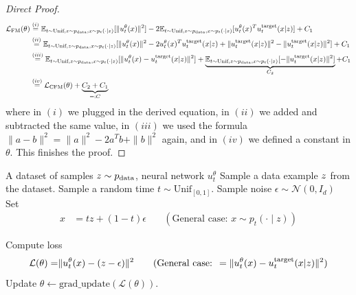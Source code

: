 \begin{proof}[Direct Proof]
\begin{align*}
\mathcal{L}_{\text{FM}}(\theta)&\overset{(i)}{=}\mathbb{E}_{t\sim\text{Unif},z\sim p_{\rm{data}}, x\sim p_t(\cdot|z)}[\|u_t^\theta(x)\|^2]-2\mathbb{E}_{t\sim\text{Unif},z\sim p_{\rm{data}}, x\sim p_t(\cdot|z)}[u_t^\theta(x)^Tu^{\text{target}}_t(x|z)] +C_1\\
&\overset{(ii)}{=}\mathbb{E}_{t\sim\text{Unif},z\sim p_{\rm{data}}, x\sim p_t(\cdot|z)}[\|u_t^\theta(x)\|^2-2u_t^\theta(x)^Tu^{\text{target}}_t(x|z)+\|u^{\text{target}}_t(x|z)\|^2-\|u^{\text{target}}_t(x|z)\|^2] +C_1\\
&\overset{(iii)}{=}\mathbb{E}_{t\sim\text{Unif},z\sim p_{\rm{data}}, x\sim p_t(\cdot|z)}[\|u_t^\theta(x)-u^{\text{target}}_t(x|z)\|^2]+\underbrace{\mathbb{E}_{t\sim\text{Unif},z\sim p_{\rm{data}}, x\sim p_t(\cdot|z)}[-\|u^{\text{target}}_t(x|z)\|^2]}_{C_2} +C_1\\
&\overset{(iv)}{=}\mathcal{L}_{\text{CFM}}(\theta) + \underbrace{C_2+C_1}_{=:C}
\end{align*}
where in $(i)$ we plugged in the derived equation, in $(ii)$ we added and subtracted the same value,  in $(iii)$ we used the formula $\|a-b\|^2=\|a\|^2-2a^Tb+\|b\|^2$ again, and in $(iv)$ we defined a constant in $\theta$. This finishes the proof.
\end{proof}
\begin{algorithm}[ht]
\caption{Flow Matching Training Procedure (for Gaussian CondOT path $p_t(x|z)=\mathcal{N}(tz,(1-t)^2)$)}
\label{alg:training_fm_basic}
\begin{algorithmic}[1]
\REQUIRE A dataset of samples $z\sim p_{\rm{data}}$, neural network $u_t^\theta$
    \STATE Sample a data example $z$ from the dataset.
    \STATE Sample a random time $t \sim \text{Unif}_{[0,1]}$.
    \STATE Sample noise $\epsilon\sim\mathcal{N}(0,I_d)$
    \STATE Set 
    \begin{align*}
        x&=t z + (1-t)\epsilon \quad &(\text{General case: }x\sim p_t(\cdot\mid z))
    \end{align*}
    
    \STATE Compute loss
    \begin{align*}
        \mathcal{L}(\theta) =& \|u_t^\theta(x)-(z-\epsilon)\|^2 \quad &(\text{General case: }=\|u_t^\theta(x)-u^{\text{target}}_t(x|z)\|^2)
    \end{align*}
    \STATE Update $\theta \gets \text{grad\_update}(\mathcal{L}(\theta))$.
\ENDFOR
\end{algorithmic}
\end{algorithm}
